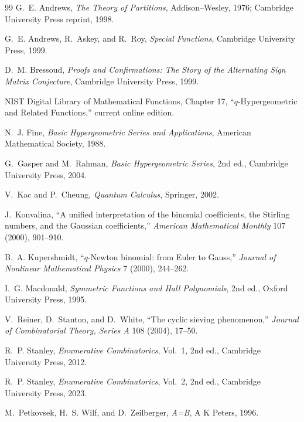 \documentclass[11pt]{article}
\numberwithin{equation}{section}
\theoremstyle{definition}
\begin{document}
\begin{thebibliography}{99}
G.~E. Andrews, \emph{The Theory of Partitions}, Addison--Wesley, 1976; Cambridge University Press reprint, 1998.

G.~E. Andrews, R.~Askey, and R.~Roy, \emph{Special Functions}, Cambridge University Press, 1999.

D.~M. Bressoud, \emph{Proofs and Confirmations: The Story of the Alternating Sign Matrix Conjecture}, Cambridge University Press, 1999.

NIST Digital Library of Mathematical Functions, Chapter 17, ``$q$-Hypergeometric and Related Functions,'' current online edition.

N.~J. Fine, \emph{Basic Hypergeometric Series and Applications}, American Mathematical Society, 1988.

G.~Gasper and M.~Rahman, \emph{Basic Hypergeometric Series}, 2nd ed., Cambridge University Press, 2004.

V.~Kac and P.~Cheung, \emph{Quantum Calculus}, Springer, 2002.

J.~Konvalina, ``A unified interpretation of the binomial coefficients, the Stirling numbers, and the Gaussian coefficients,'' \emph{American Mathematical Monthly} 107 (2000), 901--910.

B.~A. Kupershmidt, ``$q$-Newton binomial: from Euler to Gauss,'' \emph{Journal of Nonlinear Mathematical Physics} 7 (2000), 244--262.

I.~G. Macdonald, \emph{Symmetric Functions and Hall Polynomials}, 2nd ed., Oxford University Press, 1995.

V.~Reiner, D.~Stanton, and D.~White, ``The cyclic sieving phenomenon,'' \emph{Journal of Combinatorial Theory, Series A} 108 (2004), 17--50.

R.~P. Stanley, \emph{Enumerative Combinatorics}, Vol.~1, 2nd ed., Cambridge University Press, 2012.

R.~P. Stanley, \emph{Enumerative Combinatorics}, Vol.~2, 2nd ed., Cambridge University Press, 2023.

M.~Petkovsek, H.~S. Wilf, and D.~Zeilberger, \emph{A=B}, A K Peters, 1996.
\end{thebibliography}
\end{document}
